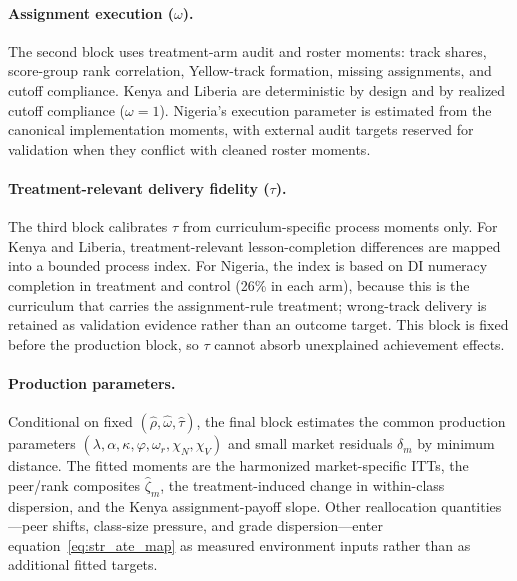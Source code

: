 \documentclass[11pt]{article}
\begin{document}
\paragraph{Assignment execution ($\omega$).} The second block uses treatment-arm audit and roster moments: track shares, score-group rank correlation, Yellow-track formation, missing assignments, and cutoff compliance. Kenya and Liberia are deterministic by design and by realized cutoff compliance ($\omega=1$). Nigeria's execution parameter is estimated from the canonical implementation moments, with external audit targets reserved for validation when they conflict with cleaned roster moments.

\paragraph{Treatment-relevant delivery fidelity ($\tau$).} The third block calibrates $\tau$ from curriculum-specific process moments only. For Kenya and Liberia, treatment-relevant lesson-completion differences are mapped into a bounded process index. For Nigeria, the index is based on DI numeracy completion in treatment and control (26\% in each arm), because this is the curriculum that carries the assignment-rule treatment; wrong-track delivery is retained as validation evidence rather than an outcome target. This block is fixed before the production block, so $\tau$ cannot absorb unexplained achievement effects.

\paragraph{Production parameters.} Conditional on fixed $(\hat{\rho}, \hat{\omega}, \hat{\tau})$, the final block estimates the common production parameters $(\lambda, \alpha, \kappa, \varphi, \omega_r, \chi_N, \chi_V)$ and small market residuals $\delta_m$ by minimum distance. The fitted moments are the harmonized market-specific ITTs, the peer/rank composites $\hat{\zeta}_m$, the treatment-induced change in within-class dispersion, and the Kenya assignment-payoff slope. Other reallocation quantities---peer shifts, class-size pressure, and grade dispersion---enter equation~\eqref{eq:str_ate_map} as measured environment inputs rather than as additional fitted targets.
\end{document}
